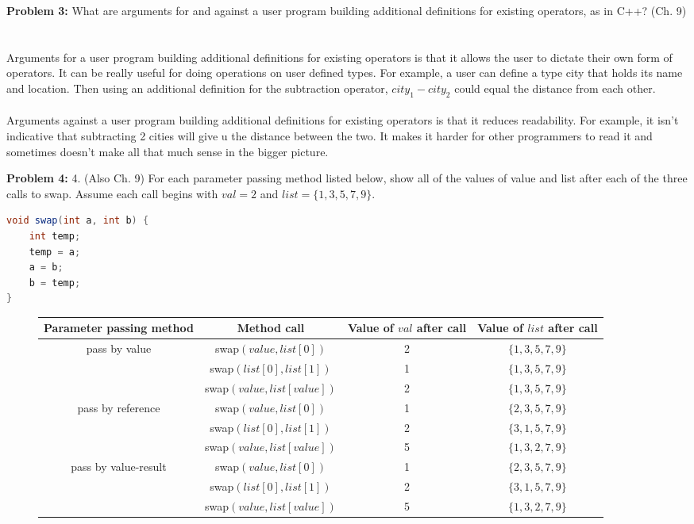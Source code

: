 \documentclass[11pt]{article}
\newenvironment{problem}[1]{\textbf{Problem #1: }}{\newpage}
\begin{document}
	\begin{problem}{3}
		What are arguments for and against a user program building additional definitions for existing operators, as in C++? (Ch. 9)
		\\ \\ \\
		Arguments for a user program building additional definitions for existing operators is that it allows the user to dictate their own form of operators.  It can be really useful for doing operations on user defined types.  For example, a user can define a type city that holds its name and location.  Then using an additional definition for the subtraction operator, $city_1 - city_2$ could equal the distance from each other.
		\\ \\
		Arguments against a user program building additional definitions for existing operators is that it reduces readability.  For example, it isn't indicative that subtracting 2 cities will give u the distance between the two.  It makes it harder for other programmers to read it and sometimes doesn't make all that much sense in the bigger picture. 
	\end{problem}
	
	\begin{problem}{4}
		4.	(Also Ch. 9) For each parameter passing method listed below, show all of the values of value and list after each of the three calls to swap. Assume each call begins with $val = 2$ and $list = \{1,3,5,7,9\}$.  
		\\ 
\begin{lstlisting}[language=Java]
void swap(int a, int b) {
	int temp;
	temp = a;
	a = b;
	b = temp;
}
\end{lstlisting}
		\begin{figure}[h!]
			\centering
			\begin{tabular}{|c|c|c|c|}
				\hline
				Parameter passing method & Method call & Value of $val$ after call & Value of $list$ after call \\
				\hline
				pass by value & swap$(value, list[0])$ & 2 & $\{1,3,5,7,9\}$\\
				\hline
				& swap$(list[0], list[1])$ & 1 & $\{1,3,5,7,9\}$\\
				\hline
				& swap$(value, list[value])$ & 2 & $\{1,3,5,7,9\}$\\
				\hline 
				pass by reference & swap$(value, list[0])$ & 1 & $\{2,3,5,7,9\}$\\
				\hline
				& swap$(list[0], list[1])$ & 2 & $\{3,1,5,7,9\}$\\
				\hline
				& swap$(value, list[value])$ & 5 & $\{1,3,2,7,9\}$\\
				\hline
				pass by value-result & swap$(value, list[0])$ & 1 & $\{2,3,5,7,9\}$ \\
				\hline
				& swap$(list[0], list[1])$ & 2 & $\{3,1,5,7,9\}$ \\
				\hline
				& swap$(value, list[value])$ &5 & $\{1,3,2,7,9\}$ \\
				\hline
			\end{tabular}
		\end{figure}
	\end{problem}
	
\end{document}
